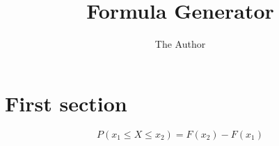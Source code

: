 \documentclass[11pt]{article} %
\title{Formula Generator}
\author{The Author}
\begin{document}
\maketitle

\section{First section}

\[P(x_1\leq X\leq x_2) = F(x_2)-F(x_1)\]
\end{document}
